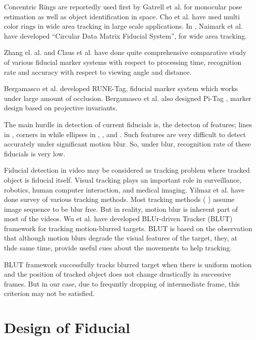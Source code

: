 \documentclass[runningheads]{llncs}
\begin{document}
Concentric Rings are reportedly used first by Gatrell et al.\cite{concentric}
for monocular pose estimation as well as object identification in space. Cho et al.
\cite{Cho:2001}\cite{Cho97fastcolor} have used multi color rings in wide area
tracking in large scale applications. In \cite{NaimarkF02}, Naimark et al.
have developed ``Circular Data Matrix Fiducial System'', for wide area tracking.

Zhang el. al.\cite{Zhang:2002} and Claus et al. \cite{ClausF04} have done
quite comprehensive comparative study of various fiducial marker systems with
respect to processing time, recognition rate and accuracy with
respect to viewing angle and distance.

Bergamasco et al. \cite{runetag11} developed RUNE-Tag, fiducial marker
system which works under large amount of occlusion. Bergamasco et al. also 
designed Pi-Tag \cite{Pitag13}, marker design based on projective
invariants.

The main hurdle in detection of current fiducials is, the detecton of features;
lines in \cite{ARToolkit02}, corners in \cite{Fiala05} while ellipses in
\cite{Cho:2001}, \cite{Cho97fastcolor}, \cite{runetag11} and \cite{Pitag13}.
Such features are very difficult to detect accurately under significant motion
blur. So, under blur, recognition rate of these fiducials is very low. 

Fiducial detection in video may be considered as tracking problem where tracked
object is fiducial itself. Visual tracking plays an important role in
surveillance, robotics, human computer interaction, and medical
imaging\cite{Yilmaz:2006}. Yilmaz et al.\cite{Yilmaz:2006} have done survey of
various tracking methods. Most tracking methods
( \cite{Ross:2008} \cite{Wu:2009} \cite{Perez02} \cite{Mei:2009} ) assume image
sequence to be blur free. But in reality, motion blur is inherent part of most
of the videos. Wu et al.\cite{Wu:2011} have developed BLUr-driven Tracker (BLUT)
framework for tracking motion-blurred targets. BLUT is based on the observation
that although motion blurs degrade the visual features of the target, they, at
thde same time, provide useful cues about the movements to help tracking.
 
BLUT framework successfully tracks blurred target when there is uniform motion
and the position of tracked object does not change drastically in successive
frames. But in our case, due to frequntly dropping of intermediate frame, this
criterion may not be satisfied.
 
\section{Design of Fiducial}
\end{document}
